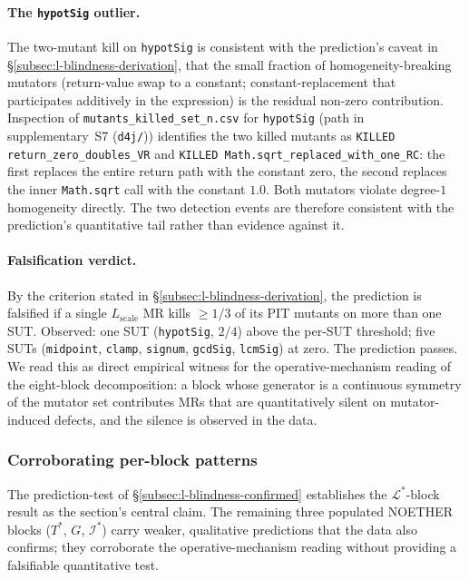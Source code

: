 \documentclass[acmsmall, screen]{acmart}
\begin{document}
\paragraph{The \texttt{hypotSig} outlier.}
The two-mutant kill on \texttt{hypotSig} is consistent with the
prediction's caveat in \S\ref{subsec:l-blindness-derivation}, that
the small fraction of homogeneity-breaking mutators (return-value
swap to a constant; constant-replacement that participates additively
in the expression) is the residual non-zero contribution. Inspection
of \texttt{mutants\_killed\_set\_n.csv} for \texttt{hypotSig} (path
in supplementary~S7 (\texttt{d4j/})) identifies the two killed mutants as
\texttt{KILLED\,return\_zero\_doubles\_VR} and
\texttt{KILLED\,Math.sqrt\_replaced\_with\_one\_RC}: the first
replaces the entire return path with the constant zero, the second
replaces the inner \texttt{Math.sqrt} call with the constant $1.0$.
Both mutators violate degree-$1$ homogeneity directly. The two
detection events are therefore consistent with the prediction's
quantitative tail rather than evidence against it.

\paragraph{Falsification verdict.}
By the criterion stated in \S\ref{subsec:l-blindness-derivation}, the
prediction is falsified if a single $L_{\mathrm{scale}}$ MR kills
$\ge 1/3$ of its PIT mutants on more than one SUT. Observed: one SUT
(\texttt{hypotSig}, $2/4$) above the per-SUT threshold; five SUTs
(\texttt{midpoint}, \texttt{clamp}, \texttt{signum}, \texttt{gcdSig},
\texttt{lcmSig}) at zero. The prediction passes. We read this as
direct empirical witness for the operative-mechanism reading of the
eight-block decomposition: a block whose generator is a continuous
symmetry of the mutator set contributes MRs that are quantitatively
silent on mutator-induced defects, and the silence is observed in
the data.

\subsubsection{Corroborating per-block patterns}
\label{subsec:other-blocks}

The prediction-test of
\S\ref{subsec:l-blindness-confirmed} establishes the
$\mathcal{L}^{*}$-block result as the section's central claim. The
remaining three populated NOETHER blocks ($T^{*}$, $G$,
$\mathcal{I}^{*}$) carry weaker, qualitative predictions that the
data also confirms; they corroborate the operative-mechanism reading
without providing a falsifiable quantitative test.
\end{document}
